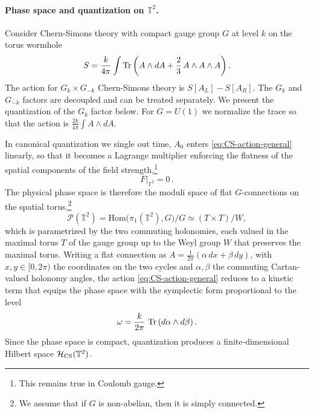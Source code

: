 \documentclass[11pt]{article}
\numberwithin{equation}{section}
\begin{document}
\paragraph{Phase space and quantization on $\mathbb{T}^2$.} Consider Chern-Simons theory with compact gauge group $G$ at level $k$ on the torus wormhole 
\begin{equation}
    S=\frac{k}{4\pi}\int \operatorname{Tr}\left(A\wedge dA+\frac{2}{3}\,A\wedge A\wedge A\right).
    \label{eq:CS-action-general}
\end{equation}
The action for $G_k\times G_{-k}$ Chern-Simons theory is $S[A_L]-S[A_R]$. The $G_k$ and $G_{-k}$ factors are decoupled and can be treated separately. We present the quantization of the $G_k$ factor below. For $G=U(1)$ we normalize the trace so that the action is $\frac{2k}{4\pi}\int A\wedge dA$.

In canonical quantization we single out time, $A_0$ enters \eqref{eq:CS-action-general} linearly, so that it becomes a Lagrange multiplier enforcing the flatness of the spatial components of the field strength,\footnote{This remains true in Coulomb gauge.}
\begin{equation}
    F\big|_{\mathbb{T}^2}=0\,.
    \label{eq:flatness-constraint}
\end{equation}
The physical phase space is therefore the moduli space of flat $G$-connections on the spatial torus,\footnote{We assume that if $G$ is non-abelian, then it is simply connected.}
\begin{equation}
    \mathcal P(\mathbb{T}^2)
    =\mathrm{Hom}\bigl(\pi_1(\mathbb{T}^2),G\bigr)/G
    \simeq (T\times T)/W ,
    \label{eq:CS-phase-space}
\end{equation}
which is parametrized by the two commuting holonomies, each valued in the maximal torus $T$ of the gauge group up to the Weyl group $W$ that preserves the maximal torus. Writing a flat connection as $A=\frac{1}{2\pi}\left(\alpha\,dx+\beta\,dy\right)$, with $x,y\in[0,2\pi)$ the coordinates on the two cycles and $\alpha,\beta$ the commuting Cartan-valued holonomy angles, the action \eqref{eq:CS-action-general} reduces to a kinetic term that equips the phase space with the symplectic form proportional to the level
\begin{equation}
    \omega=\frac{k}{2\pi}\,\operatorname{Tr}\left(d\alpha\wedge d\beta\right).
    \label{eq:CS-symplectic}
\end{equation}
 Since the phase space is compact, quantization produces a finite-dimensional Hilbert space $\mathcal H_{\rm CS}(\mathbb{T}^2)$.
\end{document}

